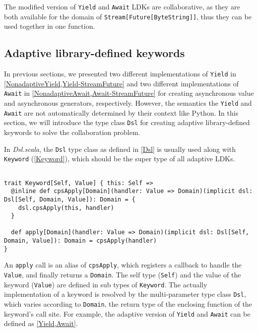 The modified version of \lstinline{Yield} and \lstinline{Await} LDKs are collaborative, as they are both available for the domain of \lstinline{Stream[Future[ByteString]]}, thus they can be used together in one function.

\subsection{Adaptive library-defined keywords}\label{Adaptive library-defined keywords}

In previous sections, we presented two different implementations of \lstinline{Yield} in \cref{NonadaptiveYield,Yield-StreamFuture} and two different implementations of \lstinline{Await} in \cref{NonadaptiveAwait,Await-StreamFuture} for creating asynchronous value and asynchronous generators, respectively. However, the semantics the \lstinline{Yield} and \lstinline{Await} are not automatically determined by their context like Python. In this section, we will introduce the type class \lstinline{Dsl} for creating adaptive library-defined keywords to solve the collaboration problem.

In \textit{Dsl.scala}, the \lstinline{Dsl} type class as defined in \cref{Dsl} is usually used along with \lstinline{Keyword} (\cref{Keyword}), which should be the super type of all adaptive LDKs.

\begin{lstlisting}[caption={\lstinline{Keyword}, the super type of all adaptive LDKs},label={Keyword}]

trait Keyword[Self, Value] { this: Self =>
  @inline def cpsApply[Domain](handler: Value => Domain)(implicit dsl: Dsl[Self, Domain, Value]): Domain = {
    dsl.cpsApply(this, handler)
  }

  def apply[Domain](handler: Value => Domain)(implicit dsl: Dsl[Self, Domain, Value]): Domain = cpsApply(handler)
}
\end{lstlisting}

An \lstinline{apply} call is an alias of \lstinline{cpsApply}, which registers a callback to handle the \lstinline{Value}, and finally returns a \lstinline{Domain}. The self type (\lstinline{Self}) and the value of the keyword (\lstinline{Value}) are defined in sub types of \lstinline{Keyword}. The actually implementation of a keyword is resolved by the multi-parameter type class \lstinline{Dsl}, which varies according to \lstinline{Domain}, the return type of the enclosing function of the keyword's call site. For example, the adaptive version of \lstinline{Yield} and \lstinline{Await} can be defined as \cref{Yield,Await}.

